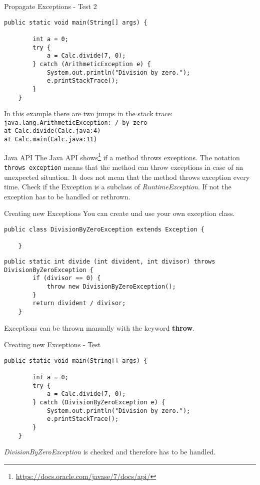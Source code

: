 \begin{frame}[fragile]{Propagate Exceptions - Test 2}
	\begin{lstlisting}[basicstyle=\ttfamily\scriptsize, firstnumber=7]
	public static void main(String[] args) {
	
	    int a = 0;
	    try {
	        a = Calc.divide(7, 0);
	    } catch (ArithmeticException e) {
	        System.out.println("Division by zero.");
	        e.printStackTrace();
	    }
	}
	\end{lstlisting}
	In this example there are two jumps in the stack trace:\\
	\texttt{java.lang.ArithmeticException: / by zero}\\
	\texttt{at Calc.divide(Calc.java:4)}\\
	\texttt{at Calc.main(Calc.java:11)}
\end{frame}

\begin{frame}{Java API}
	The Java API shows\footnote{\scriptsize\url{https://docs.oracle.com/javase/7/docs/api/}}
	if a method throws exceptions. 
	The notation \texttt{throws exception} means that the method can throw 
	exceptions in case of an unexpected situation.
	It does not mean that the method throws exception every time.
	\vfill
	Check if the Exception is a subclass of \emph{RuntimeException}. 
	If not the exception has to be handled or rethrown.
\end{frame}

\begin{frame}[fragile]{Creating new Exceptions}
	You can create und use your own exception class.
	\begin{lstlisting}[basicstyle=\ttfamily\scriptsize]
	public class DivisionByZeroException extends Exception {

	}
	\end{lstlisting}
	\vfill
	\begin{lstlisting}[basicstyle=\ttfamily\scriptsize]
	public static int divide (int divident, int divisor) throws DivisionByZeroException {
	    if (divisor == 0) {
	        throw new DivisionByZeroException();
	    }
	    return divident / divisor;
	}
	\end{lstlisting}	
	Exceptions can be thrown manually with the keyword \textbf{throw}.
\end{frame}

\begin{frame}[fragile]{Creating new Exceptions - Test}
	\begin{lstlisting}[basicstyle=\ttfamily\scriptsize]
	public static void main(String[] args) {
	
	    int a = 0;
	    try {
	        a = Calc.divide(7, 0);
	    } catch (DivisionByZeroException e) {
	        System.out.println("Division by zero.");
	        e.printStackTrace();
	    }
	}
	\end{lstlisting}	
	\emph{DivisionByZeroException} is checked and therefore has to be handled.
\end{frame}

